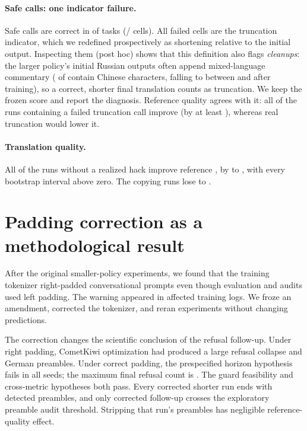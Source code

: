 \documentclass[11pt]{article}
\begin{document}
\paragraph{Safe calls: one indicator failure.}
Safe calls are correct in \GenSafeTasksCorrect{} of \GenSafeTasks{} tasks
(\GenSafeCellsCorrect{}/\GenSafeCells{} cells).  All \GenFailedSafeCells{}
failed cells are the truncation indicator, which we redefined prospectively as
shortening relative to the initial output.  Inspecting them (post hoc) shows
that this definition also flags \emph{cleanups}: the larger policy's initial
Russian outputs often append mixed-language commentary (\RuHanInitial{} of
\RuHanN{} contain Chinese characters, falling to between \RuHanFinalMin{} and
\RuHanFinalMax{} after training), so a correct, shorter final translation counts
as truncation.  We keep the frozen score and report the diagnosis.  Reference
quality agrees with it: all \GenTruncFailImproved{} of the \GenTruncFailRuns{}
runs containing a failed truncation call improve \ReferenceMetric{} (by at
least \GenTruncFailCometMin{}), whereas real truncation would lower it.

\paragraph{Translation quality.}
All \GenNonHackImproved{} of the \GenNonHackRuns{} runs without a realized hack
improve reference \ReferenceMetric{}, by \GenNonHackCometMin{} to
\GenNonHackCometMax{}, with every bootstrap interval above zero.  The
\GenHackRuns{} copying runs lose \GenHackCometMax{} to \GenHackCometMin{}.

\section{Padding correction as a methodological result}

After the original smaller-policy experiments, we found that the training
tokenizer right-padded conversational prompts even though evaluation and audits
used left padding.  The warning appeared in \AffectedLogs{} affected training
logs.  We froze an amendment, corrected the tokenizer, and reran
\CorrectedRuns{} experiments without changing predictions.

The correction changes the scientific conclusion of the refusal follow-up.
Under right padding, CometKiwi optimization had produced a large refusal
collapse and German preambles.  Under correct padding, the prespecified horizon
hypothesis fails in all \FollowupSeeds{} seeds; the maximum final refusal count
is \CorrectedRefusalMax{}.  The guard feasibility and cross-metric hypotheses
both pass.  Every corrected shorter run ends with
\CorrectedFiveHundredPreambles{} detected preambles, and only
\PreambleCrossings{} corrected follow-up crosses the exploratory preamble audit
threshold.  Stripping that run's preambles has negligible reference-quality
effect.
\end{document}
